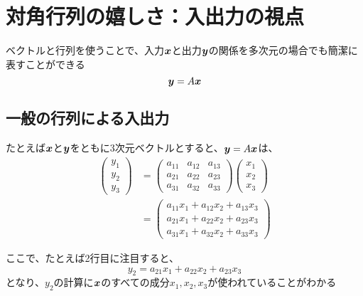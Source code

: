 \documentclass[../../../topic_linear-algebra]{subfiles}
\begin{document}
\sectionline
\section{対角行列の嬉しさ：入出力の視点}

ベクトルと行列を使うことで、入力$\vb*{x}$と出力$\vb*{y}$の関係を多次元の場合でも簡潔に表すことができる
\begin{equation*}
  \vb*{y} = A \vb*{x}
\end{equation*}

\subsection{一般の行列による入出力}

たとえば$\vb*{x}$と$\vb*{y}$をともに3次元ベクトルとすると、$\vb*{y} = A \vb*{x}$は、
\begin{align*}
  \begin{pmatrix}
    y_1 \\
    y_2 \\
    y_3
  \end{pmatrix} & = \begin{pmatrix}
                      a_{11} & a_{12} & a_{13} \\
                      a_{21} & a_{22} & a_{23} \\
                      a_{31} & a_{32} & a_{33}
                    \end{pmatrix}
  \begin{pmatrix}
    x_1 \\
    x_2 \\
    x_3
  \end{pmatrix}                                        \\
                  & = \begin{pmatrix}
                        a_{11}x_1 + a_{12}x_2 + a_{13}x_3 \\
                        a_{21}x_1 + a_{22}x_2 + a_{23}x_3 \\
                        a_{31}x_1 + a_{32}x_2 + a_{33}x_3
                      \end{pmatrix}
\end{align*}

\br

ここで、たとえば2行目に注目すると、
\begin{equation*}
  y_2 = a_{21}x_1 + a_{22}x_2 + a_{23}x_3
\end{equation*}
となり、$y_2$の計算に$\vb*{x}$のすべての成分$x_1, x_2, x_3$が使われていることがわかる
\end{document}
